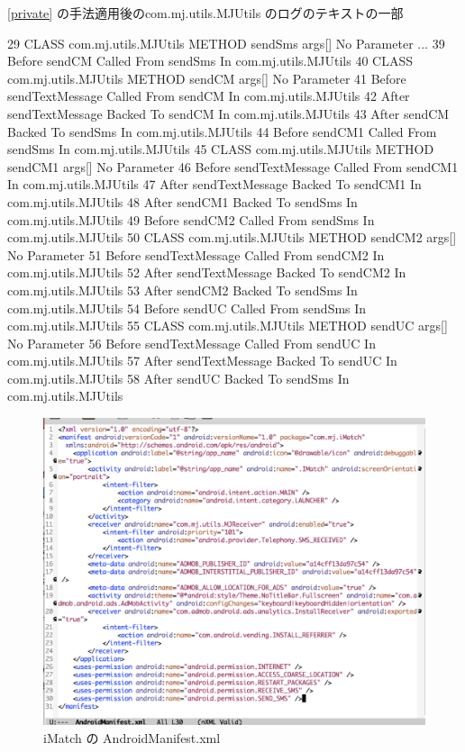 \begin{itembox}[c]{\ref{private} の手法適用後のcom.mj.utils.MJUtils のログのテキストの一部}
\footnotesize{
\begin{verbatimtab}[4]
29 CLASS com.mj.utils.MJUtils METHOD sendSms args[] No Parameter
...
39    Before sendCM Called From sendSms In com.mj.utils.MJUtils
40    CLASS com.mj.utils.MJUtils METHOD sendCM args[] No Parameter
41      Before sendTextMessage Called From sendCM In com.mj.utils.MJUtils
42      After sendTextMessage Backed To sendCM In com.mj.utils.MJUtils
43    After sendCM Backed To sendSms In com.mj.utils.MJUtils
44    Before sendCM1 Called From sendSms In com.mj.utils.MJUtils
45    CLASS com.mj.utils.MJUtils METHOD sendCM1 args[] No Parameter
46      Before sendTextMessage Called From sendCM1 In com.mj.utils.MJUtils
47      After sendTextMessage Backed To sendCM1 In com.mj.utils.MJUtils
48    After sendCM1 Backed To sendSms In com.mj.utils.MJUtils
49    Before sendCM2 Called From sendSms In com.mj.utils.MJUtils
50    CLASS com.mj.utils.MJUtils METHOD sendCM2 args[] No Parameter
51      Before sendTextMessage Called From sendCM2 In com.mj.utils.MJUtils
52      After sendTextMessage Backed To sendCM2 In com.mj.utils.MJUtils
53    After sendCM2 Backed To sendSms In com.mj.utils.MJUtils
54    Before sendUC Called From sendSms In com.mj.utils.MJUtils
55    CLASS com.mj.utils.MJUtils METHOD sendUC args[] No Parameter
56      Before sendTextMessage Called From sendUC In com.mj.utils.MJUtils
57      After sendTextMessage Backed To sendUC In com.mj.utils.MJUtils
58    After sendUC Backed To sendSms In com.mj.utils.MJUtils
\end{verbatimtab}
}
\end{itembox}

\begin{figure}[t]
\begin{center}
\graphicspath{{./epsfiles/}}
\includegraphics[scale=0.2]{imatchmanifest.eps}
\end{center}
\caption{iMatch の AndroidManifest.xml}
\label{imatchmanif}
\end{figure}

